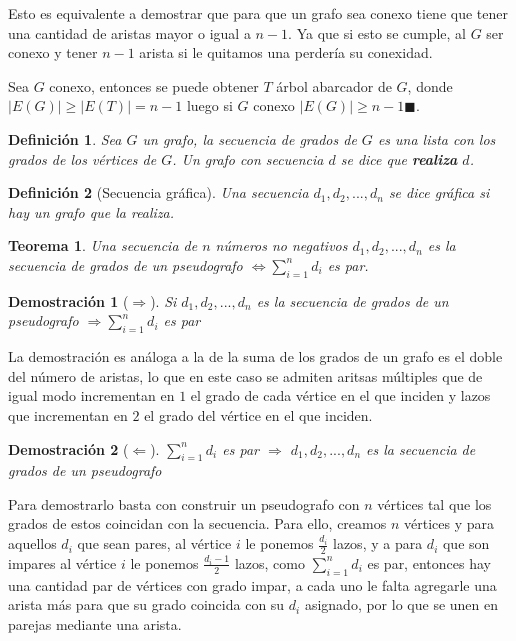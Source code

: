 \documentclass[a4paper,1pt]{report}
\newtheorem*{teo}{Teorema}
\newtheorem*{dem}{Demostración}
\newtheorem*{dfn}{Definición}
\begin{document}
Esto es equivalente a demostrar que para que un grafo sea conexo tiene que tener una cantidad de aristas mayor o igual a $n-1$. Ya que si esto se cumple, al $G$ ser conexo y tener $n-1$ arista si le quitamos una perder\'ia su conexidad.

Sea $G$ conexo, entonces se puede obtener $T$ \'arbol abarcador de $G$, donde $|E(G)| \geq |E(T)| = n-1$ luego si $G$ conexo $|E(G)| \geq n-1 \blacksquare$. 


\begin{dfn}
    Sea $G$ un grafo, la secuencia de grados de $G$ es una lista con los grados de los v\'ertices de $G$. Un grafo con secuencia $d$ se dice que \textbf{realiza} $d$.
\end{dfn}

\begin{dfn}[Secuencia gr\'afica]
    Una secuencia $d_1, d_2, ..., d_n$ se dice gr\'afica si hay un grafo que la realiza.
\end{dfn}

\begin{teo}
    Una secuencia de $n$ n\'umeros no negativos $d_1, d_2,..., d_n$ es la secuencia de grados de un pseudografo $\Leftrightarrow \sum_{i=1}^{n} d_i$ es par.
\end{teo}

\begin{dem}[$\Rightarrow$] Si $d_1, d_2,..., d_n$ es la secuencia de grados de un pseudografo  $\Rightarrow \sum_{i=1}^{n} d_i$ es par\end{dem}

La demostraci\'on es an\'aloga a la de la suma de los grados de un grafo es el doble del n\'umero de aristas, lo que en este caso se admiten aritsas m\'ultiples que de igual modo incrementan en $1$ el grado de cada v\'ertice en el que inciden y lazos que incrementan en $2$ el grado del v\'ertice en el que inciden.

\begin{dem}[$\Leftarrow$]  $\sum_{i=1}^{n} d_i$ es par $\Rightarrow$ $d_1, d_2,..., d_n$ es la secuencia de grados de un pseudografo \end{dem}

Para demostrarlo basta con construir un pseudografo con $n$ v\'ertices tal que los grados de estos coincidan con la secuencia. Para ello, creamos $n$ v\'ertices y para aquellos $d_i$ que sean pares, al v\'ertice $i$ le ponemos $\frac{d_i}{2}$ lazos, y a para $d_i$ que son impares al v\'ertice $i$ le ponemos $\frac{d_i -1}{2}$ lazos, como $\sum_{i=1}^n d_i$ es par, entonces hay una cantidad par de v\'ertices con grado impar, a cada uno le falta agregarle una arista m\'as para que su grado coincida con su $d_i$ asignado, por lo que se unen en parejas mediante una arista.
\end{document}
